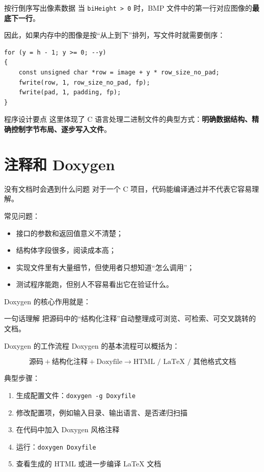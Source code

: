 \documentclass[aspectratio=169,11pt]{beamer}
\begin{document}
\begin{frame}[fragile]{按行倒序写出像素数据}
当 \texttt{biHeight > 0} 时，BMP 文件中的第一行对应图像的\textbf{最底下一行}。

因此，如果内存中的图像是按“从上到下”排列，写文件时就需要倒序：

\begin{lstlisting}
for (y = h - 1; y >= 0; --y)
{
    const unsigned char *row = image + y * row_size_no_pad;
    fwrite(row, 1, row_size_no_pad, fp);
    fwrite(pad, 1, padding, fp);
}
\end{lstlisting}

\begin{alertblock}{程序设计要点}
这里体现了 C 语言处理二进制文件的典型方式：\textbf{明确数据结构、精确控制字节布局、逐步写入文件}。
\end{alertblock}
\end{frame}



\section{注释和 Doxygen}

\begin{frame}{没有文档时会遇到什么问题}
对于一个 C 项目，代码能编译通过并不代表它容易理解。

常见问题：
\begin{itemize}
  \item 接口的参数和返回值意义不清楚；
  \item 结构体字段很多，阅读成本高；
  \item 实现文件里有大量细节，但使用者只想知道“怎么调用”；
  \item 测试程序能跑，但别人不容易看出它在验证什么。
\end{itemize}

\vspace{0.5em}
Doxygen 的核心作用就是：

\begin{block}{一句话理解}
把源码中的“结构化注释”自动整理成可浏览、可检索、可交叉跳转的文档。
\end{block}
\end{frame}

\begin{frame}{Doxygen 的工作流程}
Doxygen 的基本流程可以概括为：

\[
\text{源码} + \text{结构化注释} + \text{Doxyfile}
\longrightarrow
\text{HTML / LaTeX / 其他格式文档}
\]

\vspace{0.5em}
典型步骤：
\begin{enumerate}
  \item 生成配置文件：\texttt{doxygen -g Doxyfile}
  \item 修改配置项，例如输入目录、输出语言、是否递归扫描
  \item 在代码中加入 Doxygen 风格注释
  \item 运行：\texttt{doxygen Doxyfile}
  \item 查看生成的 HTML 或进一步编译 LaTeX 文档
\end{enumerate}
\end{frame}
\end{document}
